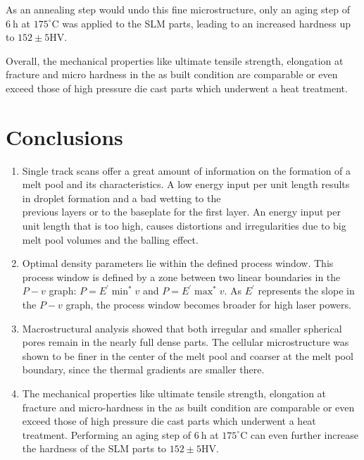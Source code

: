 \documentclass[10pt]{article}
\begin{document}
As an annealing step would undo this fine microstructure, only an aging step of $6 \mathrm{~h}$ at $175^{\circ} \mathrm{C}$ was applied to the SLM parts, leading to an increased hardness up to $152 \pm 5 \mathrm{HV}$.

Overall, the mechanical properties like ultimate tensile strength, elongation at fracture and micro hardness in the as built condition are comparable or even exceed those of high pressure die cast parts which underwent a heat treatment.

\section*{Conclusions}
\begin{enumerate}
  \item Single track scans offer a great amount of information on the formation of a melt pool and its characteristics. A low energy input per unit length results in droplet formation and a bad wetting to the\\
previous layers or to the baseplate for the first layer. An energy input per unit length that is too high, causes distortions and irregularities due to big melt pool volumes and the balling effect.

  \item Optimal density parameters lie within the defined process window. This process window is defined by a zone between two linear boundaries in the $P-v$ graph: $P=E^{\prime} \min ^{*} v$ and $P=E^{\prime} \max ^{*} v$. As $E^{\prime}$ represents the slope in the $P-v$ graph, the process window becomes broader for high laser powers.

  \item Macrostructural analysis showed that both irregular and smaller spherical pores remain in the nearly full dense parts. The cellular microstructure was shown to be finer in the center of the melt pool and coarser at the melt pool boundary, since the thermal gradients are smaller there.

  \item The mechanical properties like ultimate tensile strength, elongation at fracture and micro-hardness in the as built condition are comparable or even exceed those of high pressure die cast parts which underwent a heat treatment. Performing an aging step of $6 \mathrm{~h}$ at $175^{\circ} \mathrm{C}$ can even further increase the hardness of the SLM parts to $152 \pm 5 \mathrm{HV}$.

\end{enumerate}
\end{document}
